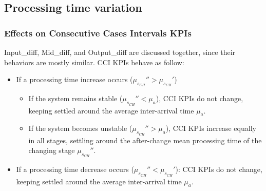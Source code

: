 \subsection{Processing time variation}
\subsubsection{Effects on Consecutive Cases Intervals KPIs}
Input\_diff, Mid\_diff, and Output\_diff are discussed together, since their behaviors are mostly similar.
CCI KPIs behave as follow:
\begin{itemize}
\item If a processing time increase occurs ($\mu_{s_{CH}}''>\mu_{s_{CH}}'$)
\begin{itemize}
\item If the system remains stable ($\mu_{s_{CH}}''<\mu_a$), CCI KPIs do not change, keeping settled around the average inter-arrival time $\mu_a$.
\item If the system becomes unstable ($\mu_{s_{CH}}''>\mu_a$), CCI KPIs increase equally in all stages, settling around the after-change mean processing time of the changing stage $\mu_{s_{CH}}''$.
\end{itemize}
\item If a processing time decrease occurs ($\mu_{s_{CH}}''<\mu_{s_{CH}}'$): CCI KPIs do not change, keeping settled around the average inter-arrival time $\mu_a$.
\end{itemize} 
